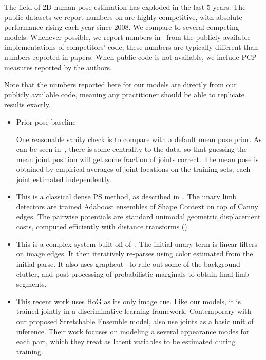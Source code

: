The field of 2D human pose estimation has exploded in the last 5 years.  The 
public datasets we report numbers on are highly competitive, with absolute 
performance rising each year since 2008.  We compare to several competing 
models.  Whenever possible, we report numbers in~ from the 
publicly available implementations of competitors' code; these numbers are 
typically different than numbers reported in papers.  When public code is not 
available, we include PCP measures reported by the authors.

Note that the numbers reported here for our models are directly from our 
publicly available code, meaning any practitioner should be able to replicate 
results exactly.

\begin{itemize}
\item Prior pose baseline 

One reasonable sanity check is to compare with a default mean pose prior.  As 
can be seen in~, there is some centrality to the 
data, so that guessing the mean joint position will get some fraction of joints 
correct.  The mean pose is obtained by empirical averages of joint locations on 
the training sets; each joint estimated independently.

\item \citet{andriluka09} 

This is a classical dense PS method, as described in~.  The unary 
limb detectors are trained Adaboost ensembles of Shape Context on top of Canny 
edges.  The pairwise potentials are standard unimodal geometric displacement 
costs, computed efficiently with distance transforms ().

\item \citet{eichner09} 

This is a complex system built off of~\citet{devacrf}.  The initial unary term 
is linear filters on image edges.  It then iteratively re-parses using color 
estimated from the initial parse.  It also uses graphcut~\citep{boykov2001} to 
rule out some of the background clutter, and post-processing of probabilistic 
marginals to obtain final limb segments.

\item \citet{deva2011} 

This recent work uses HoG as its only image cue.  Like our models, it is 
trained jointly in a discriminative learning framework.  Contemporary with our 
proposed Stretchable Ensemble model, \citet{deva2011} also use joints as a 
basic unit of inference.  Their work focuses on modeling a several appearance 
modes for each part, which they treat as latent variables to be estimated 
during training.  \end{itemize}


